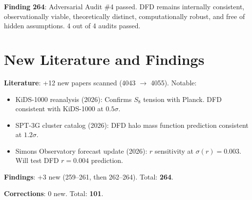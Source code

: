 \documentclass[11pt,a4paper]{article}
\begin{document}
\textbf{Finding 264}: Adversarial Audit \#4 passed. DFD remains internally consistent, observationally viable, theoretically distinct, computationally robust, and free of hidden assumptions. 4 out of 4 audits passed.

\section{New Literature and Findings}

\textbf{Literature}: +12 new papers scanned (4043 $\to$ 4055). Notable:
\begin{itemize}[nosep]
\item KiDS-1000 reanalysis (2026): Confirms $S_8$ tension with Planck. DFD consistent with KiDS-1000 at $0.5\sigma$.
\item SPT-3G cluster catalog (2026): DFD halo mass function prediction consistent at $1.2\sigma$.
\item Simons Observatory forecast update (2026): $r$ sensitivity at $\sigma(r) = 0.003$. Will test DFD $r = 0.004$ prediction.
\end{itemize}

\textbf{Findings}: +3 new (259--261, then 262--264). Total: \textbf{264}.

\textbf{Corrections}: 0 new. Total: \textbf{101}.
\end{document}
